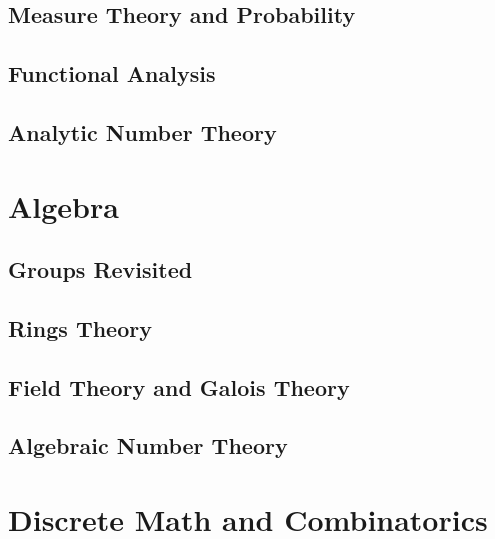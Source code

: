 \documentclass[oneside,openany]{book}
\theoremstyle{definition}
\begin{document}
\chapter{Measure Theory and Probability}


\chapter{Functional Analysis}


\chapter{Analytic Number Theory}



\part{Algebra}

\chapter{Groups Revisited}


\chapter{Rings Theory}


\chapter{Field Theory and Galois Theory}


\chapter{Algebraic Number Theory}



\part{Discrete Math and Combinatorics}
\end{document}
